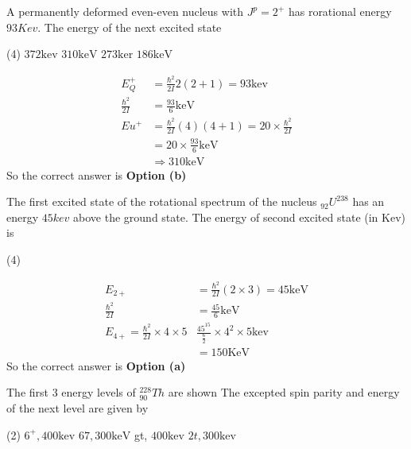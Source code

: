 \begin{exercise}
	A permanently deformed even-even nucleus with $J^p=2^+$ has rorational energy $93 Kev$. The energy of the next excited state
	 \begin{tasks}(4)
		\task[\textbf{a.}]$372 \mathrm{kev}$
		\task[\textbf{b.}] $310 \mathrm{keV}$
		\task[\textbf{c.}]$273 \mathrm{ker}$
		\task[\textbf{d.}]$186 \mathrm{keV}$ 
	\end{tasks}
\end{exercise}
\begin{answer}
	\begin{align*}
	E_{Q}^{+}&=\frac{\hbar^{2}}{2 I} 2(2+1)=93 \mathrm{kev} \\
	\frac{\hbar^{2}}{2 I}&=\frac{93}{6} \mathrm{keV}\\
	E u^{+}&=\frac{\hbar^{2}}{2 I}(4)(4+1)=20 \times \frac{\hbar^{2}}{2 I}\\
	&=20 \times \frac{93}{6} \mathrm{keV} \\
	&\Rightarrow 310 \mathrm{keV}
	\end{align*}
	So the correct answer is \textbf{Option (b)}
\end{answer}\begin{exercise}
The first excited state of the rotational spectrum of the nucleus ${}_{92}U^{238}$ has an energy $45kev$ above the ground state. The energy of second excited state (in Kev) is
 \begin{tasks}(4)
\end{tasks}
\end{exercise}
\begin{answer}
	\begin{align*}
	E_{2+}&=\frac{\hbar^{2}}{2 I}(2 \times 3)=45 \mathrm{keV}\\
	\frac{\hbar^{2}}{2 I}&=\frac{45}{6} \mathrm{keV}\\
	E_{4+}=\frac{\hbar^{2}}{2 I} \times 4 \times 5&\frac{45^{15}}{\frac{6}{2}} \times 4 ^2\times 5 \mathrm{kev}\\
	&=150 \mathrm{KeV}
	\end{align*}
	So the correct answer is \textbf{Option (a)}
\end{answer}
\begin{exercise}
	The first 3 energy levels of ${}_{90}^{228}Th$ are shown
	The excepted spin parity and energy of the next level are given by
	 \begin{tasks}(2)
		\task[\textbf{a.}]$6^{+}, 400 \mathrm{kev}$
		\task[\textbf{b.}]$67,300 \mathrm{keV}$
		\task[\textbf{c.}] gt, $400 \mathrm{kev}$
		\task[\textbf{d.}] $2 t, 300 \mathrm{kev}$
	\end{tasks}
\end{exercise}
